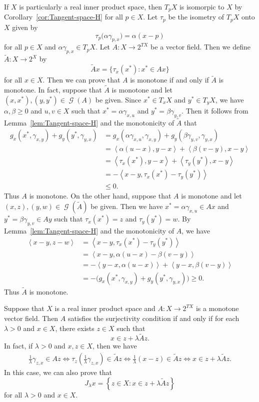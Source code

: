 \documentclass[draft]{amsart}
\numberwithin{equation}{section}
\newcommand{\ip}[2]{\left\langle #1, #2 \right\rangle}
\DeclareMathOperator{\Gra}{\mathcal{G}}
\theoremstyle{plain}
\theoremstyle{definition}
\theoremstyle{remark}
\begin{document}
If $X$ is particularly a real inner product space, then 
$T_pX$ is isomorpic to $X$ by Corollary~\ref{cor:Tangent-space-H} 
for all $p\in X$. 
Let $\tau_p$ be the isometry of $T_pX$ onto $X$ given by 
\[
 \tau_p\bigl(\alpha \gamma_{p,x}\bigr) = \alpha (x-p)
\]
for all $p\in X$ and $\alpha \gamma_{p, x}\in T_pX$. 
Let $A\colon X\to 2^{TX}$ be a vector field. 
Then we define $\tilde{A}\colon X\to 2^{X}$ by 
\[
 \tilde{A}x = \{\tau_x(x^*): x^* \in Ax\}
\]
for all $x\in X$. Then we can prove that 
$A$ is monotone if and only if $\tilde{A}$ is monotone. 
In fact, suppose that $\tilde{A}$ is monotone and let 
$(x,x^*), (y, y^*)\in \Gra(A)$ be given. 
Since $x^*\in T_xX$ and $y^*\in T_yX$, we have 
$\alpha, \beta \geq 0$ and $u, v\in X$ such that 
$x^*=\alpha \gamma_{x, u}$ and $y^*=\beta \gamma_{y, v}$. 
Then it follows from Lemma~\ref{lem:Tangent-space-H} 
and the monotonicity of $\tilde{A}$ that 
\begin{align*}
 g_{x}(x^*, \gamma_{x,y}) 
 + g_{y}(y^*, \gamma_{y,x}) 
 &= g_{x}(\alpha \gamma_{x, u}, \gamma_{x,y}) 
 + g_{y}(\beta\gamma_{y, v}, \gamma_{y,x}) \\
 &= \ip{\alpha(u-x)}{y-x} + \ip{\beta(v-y)}{x-y} \\
 &= \ip{\tau_x(x^*)}{y-x} + \ip{\tau_y(y^*)}{x-y} \\
 &= -\ip{x-y}{\tau_x(x^*)-\tau_y(y^*)} \\
 &\leq 0. 
\end{align*}
Thus $A$ is monotone. On the other hand, 
suppose that $A$ is monotone and 
let $(x,z), (y, w)\in \Gra(\tilde{A})$ be given. 
Then we have $x^*=\alpha\gamma_{x, u}\in Ax$ 
and $y^*=\beta \gamma_{y, v}\in Ay$ such that 
$\tau_x(x^*)=z$ and $\tau_y(y^*)=w$. 
By Lemma~\ref{lem:Tangent-space-H} 
and the monotonicity of $A$, we have 
\begin{align*}
 \ip{x-y}{z-w} 
 &= \ip{x-y}{\tau_x(x^*)-\tau_y(y^*)} \\
 &= \ip{x-y}{\alpha (u-x)-\beta(v-y)} \\
 &= -\ip{y-x}{\alpha (u-x)} + \ip{y-x}{\beta(v-y)} \\
 &= - \bigl(g_x(x^*, \gamma_{x, y}) + g_y(y^*, \gamma_{y, x}) \bigr)
 \geq 0. 
\end{align*}
Thus $\tilde{A}$ is monotone. 

Suppose that $X$ is a real inner product space and 
$A\colon X\to 2^{TX}$ is a monotone vector field. 
Then $A$ satisfies the surjectivity condition 
if and only if for each $\lambda > 0$ and $x\in X$, 
there exists $z\in X$ such that 
\[
 x\in z+ \lambda \tilde{A} z. 
\]
In fact, if $\lambda>0$ and $x, z\in X$, then we have 
\begin{align*}
 \frac{1}{\lambda} \gamma_{z, x} \in Az 
 \Longleftrightarrow 
 \tau_{z}\left(\frac{1}{\lambda} \gamma_{z, x}\right) \in \tilde{A}z 
 \Longleftrightarrow 
 \frac{1}{\lambda}(x-z) \in \tilde{A}z 
 \Longleftrightarrow 
 x\in z + \lambda \tilde{A}z. 
\end{align*}
In this case, we can also prove that 
\[
 J_{\lambda} x = 
 \left\{
 z\in X: x\in z+ \lambda \tilde{A}z
 \right\}
\]
for all $\lambda >0$ and $x\in X$. 
\end{document}
